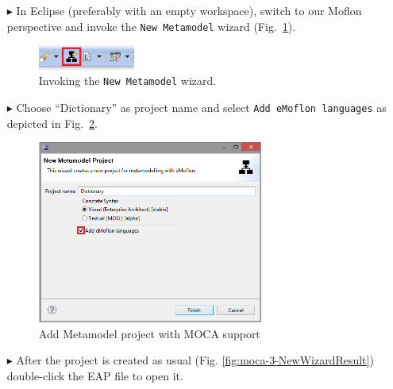 \begin{enumerate}
\item[$\blacktriangleright$] In Eclipse (preferably with an empty workspace), switch to our Moflon perspective and invoke the \texttt{New Metamodel} wizard (Fig.~\ref{fig:moca-1-NewMetamodelWizard}). 

\begin{figure}[!htbp]
\begin{center}
 \includegraphics[width=0.3\textwidth]{pics/moca/1DictionaryMetaModel/1-NewMetamodelWizard.png}
  \caption{Invoking the \texttt{New Metamodel} wizard.}
  \label{fig:moca-1-NewMetamodelWizard}
\end{center}
\end{figure}

\item[$\blacktriangleright$] Choose ``Dictionary'' as project name and select \texttt{Add eMoflon languages} as depicted in Fig.~\ref{fig:moca-2-AddMocaSupport-ProjectName}. 

\begin{figure}[!htbp]
\begin{center}
 \includegraphics[width=0.7\textwidth]{pics/moca/1DictionaryMetaModel/2-AddMocaSupport-ProjectName.png}
  \caption{Add Metamodel project with MOCA support}
  \label{fig:moca-2-AddMocaSupport-ProjectName}
\end{center}
\end{figure}

\item[$\blacktriangleright$] After the project is created as usual (Fig. \ref{fig:moca-3-NewWizardResult}) double-click the EAP file to open it. 


\end{enumerate}
